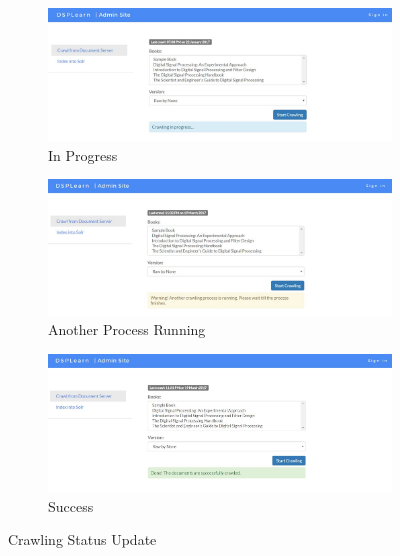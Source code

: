 \begin{figure}[!htbp]
\centering
 
  \begin{subfigure}{\textwidth}
  \centering
  \includegraphics[width=\linewidth]{system_demonstration/demo_crawl_status_running.jpg}
  \caption{In Progress}
  \label{fig:sfig:running}
  \end{subfigure}
  
  \begin{subfigure}{\textwidth}
  \centering
  \includegraphics[width=\linewidth]{system_demonstration/demo_crawl_status_warning.jpg}
  \caption{Another Process Running}
  \label{fig:sfig:denied}
  \end{subfigure}
  
  \begin{subfigure}{\textwidth}
  \centering
  \includegraphics[width=\linewidth]{system_demonstration/demo_crawl_status_success.jpg}
  \caption{Success}
  \label{fig:sfig:success}
  \end{subfigure}
 
\caption{Crawling Status Update}
\label{fig:crawl_status}
\end{figure}

